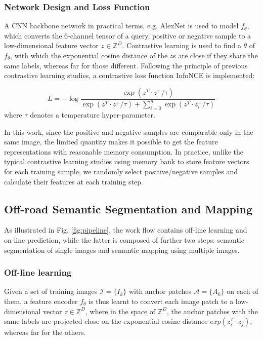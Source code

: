 \documentclass[letterpaper, 10 pt, conference]{ieeeconf}  %
\begin{document}
\subsubsection{Network Design and Loss Function}
A CNN backbone network in practical terms, e.g. AlexNet\cite{krizhevsky2012imagenet} is used to model $f_{\theta}$, which converts the 6-channel tensor of a query, positive or negative sample to a low-dimensional feature vector $z\in \mathbb{Z}^D$.
Contrastive learning is used to find a $\theta$ of $f_{\theta}$, with which the exponential cosine distance of the $z$s are close if they share the same labels, whereas far for those different.
Following the principle of previous contrastive learning studies, a contrastive loss function InfoNCE\cite{oord2018representation} is implemented:

\begin{equation}\label{loss}
L=-\log {\dfrac{\exp (z^T \cdot z^+/\tau)}{\exp (z^T \cdot z^+/\tau)+\sum_{i=0}^{n}{\exp (z^T \cdot z_i^-/\tau)}}}
\end{equation}
where $\tau$ denotes a temperature hyper-parameter.

In this work, since the positive and negative samples are comparable only in the same image, the limited quantity makes it possible to get the feature representations with reasonable memory consumption. In practice, unlike the typical contrastive learning studies\cite{Wu_2018_CVPR} using memory bank to store feature vectors for each training sample, we randomly select positive/negative samples and calculate their features at each training step.

\subsection{Off-road Semantic Segmentation and Mapping}

As illustrated in Fig. \ref{fig:pipeline}, the work flow contains off-line learning and on-line prediction, while the latter is composed of further two steps: semantic segmentation of single images and semantic mapping using multiple images.

\subsubsection{Off-line learning}
Given a set of training images $\mathcal{I}=\{I_k\}$ with anchor patches $\mathcal{A}=\{A_k\}$ on each of them, a feature encoder $f_\theta$ is thus learnt to convert each image patch to a low-dimensional vector $z\in \mathbb{Z}^D$, where in the space of $\mathbb{Z}^D$, the anchor patches with the same labels are projected close on the exponential cosine distance $exp(z_i^T \cdot z_j)$, whereas far for the others.
\end{document}
